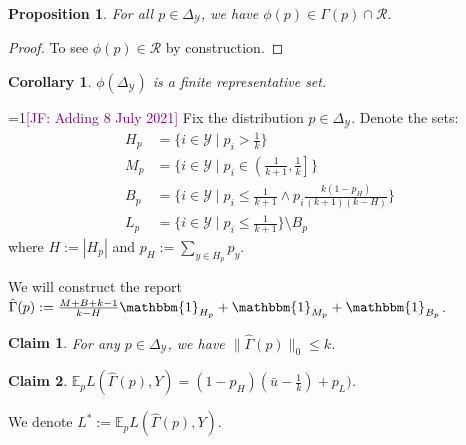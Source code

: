 \documentclass[12pt]{article}
\newcommand{\Comments}{1}
\newcommand{\mynote}[2]{\ifnum\Comments=1\textcolor{#1}{#2}\fi}
\newcommand{\jessie}[1]{\mynote{purple}{[JF: #1]}}
\newcommand{\simplex}{\Delta_\Y}
\newcommand{\E}{\mathbb{E}}
\newcommand{\R}{\mathcal{R}}
\newcommand{\Y}{\mathcal{Y}}
\newcommand{\ones}{\mathbbm{1}}
\newtheorem{proposition}{Proposition}
\newtheorem{corollary}{Corollary}
\newtheorem{claim}{Claim}
\begin{document}
\begin{proposition}
	For all $p \in \simplex$, we have $\phi(p) \in \Gamma(p) \cap \R$.
\end{proposition}
\begin{proof}
	To see $\phi(p) \in \R$ by construction. 
\end{proof}


\begin{corollary}
	$\phi(\simplex)$ is a finite representative set.
\end{corollary}

\jessie{Adding 8 July 2021}
Fix the distribution $p \in \simplex$.
Denote the sets:
\begin{align*}
H_p &= \{i \in \Y \mid p_i > \frac 1 k\}\\
M_p &= \{i \in \Y \mid p_i \in \left( \frac 1 {k+1}, \frac 1 k\right]\}\\
B_p &= \{i \in \Y \mid p_i \leq \frac 1 {k+1} \wedge p_i \frac{k(1-p_H)}{(k+1)(k-H)}\}\\
L_p &= \{i \in \Y \mid p_i \leq \frac {1}{k+1}\} \setminus B_p
\end{align*}
where $H := |H_p|$ and $p_H := \sum_{y \in H_p} p_y$.

We will construct the report $\hat \Gamma(p) := \frac{M + B + k - 1}{k-H}\ones_{H_p} + \ones_{M_p} + \ones_{B_p}$.

\begin{claim}
	For any $p \in \simplex$, we have $\|\hat \Gamma(p)\|_0 \leq k$.
\end{claim}	

\begin{claim}
	$\E_p L(\hat \Gamma(p), Y) = (1-p_H)(\bar u - \frac 1 k) + p_L)$. 
\end{claim}

We denote $L^* := \E_p L(\hat \Gamma(p), Y)$.
\end{document}
